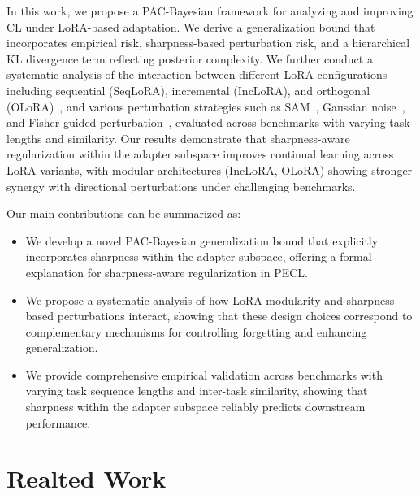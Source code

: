 \documentclass[letterpaper]{article} %
\begin{document}
In this work, we propose a PAC-Bayesian framework for analyzing and improving CL under LoRA-based adaptation. We derive a generalization bound that incorporates empirical risk, sharpness-based perturbation risk, and a hierarchical KL divergence term reflecting posterior complexity.  We further conduct a systematic analysis of the interaction between different LoRA configurations including sequential (SeqLoRA), incremental (IncLoRA), and orthogonal (OLoRA)~\cite{wang2023orthogonal}, and various perturbation strategies such as SAM~\cite{foretSharpnessAwareMinimizationEfficiently2021}, Gaussian noise~\cite{pmlr-v151-bisla22a}, and Fisher-guided perturbation~\cite{kimFisherSAMInformation2022,liRevisitingRandomWeight2024}, evaluated across benchmarks with varying task lengths and similarity. Our results demonstrate that sharpness-aware regularization within the adapter subspace improves continual learning across LoRA variants, with modular architectures (IncLoRA, OLoRA) showing stronger synergy with directional perturbations under challenging benchmarks.


Our main contributions can be summarized as:
\begin{itemize}
\item We develop a novel PAC-Bayesian generalization bound that explicitly incorporates sharpness within the adapter subspace, offering a formal explanation for sharpness-aware regularization in PECL.
\item We propose a systematic analysis of how LoRA modularity and sharpness-based perturbations interact, showing that these design choices correspond to complementary mechanisms for controlling forgetting and enhancing generalization.

\item We provide comprehensive empirical validation across benchmarks with varying task sequence lengths and inter-task similarity, showing that sharpness within the adapter subspace reliably predicts downstream performance.
\end{itemize}




\section{Realted Work}
\end{document}
